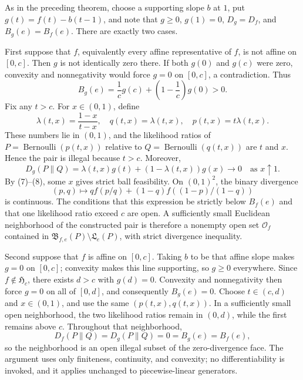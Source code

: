 As in the preceding theorem, choose a supporting slope \(b\) at \(1\), put \(g(t)=f(t)-b(t-1)\), and note that \(g\ge0\), \(g(1)=0\), \(D_g=D_f\), and \(B_g(e)=B_f(e)\).  There are exactly two cases.

First suppose that \(f\), equivalently every affine representative of \(f\), is not affine on \([0,c]\).  Then \(g\) is not identically zero there.  If both \(g(0)\) and \(g(c)\) were zero, convexity and nonnegativity would force \(g=0\) on \([0,c]\), a contradiction.  Thus
\[
 B_g(e)=\frac1c g(c)+\left(1-\frac1c\right)g(0)>0. \tag{7}
\]
Fix any \(t>c\).  For \(x\in(0,1)\), define
\[
 \lambda(t,x)=\frac{1-x}{t-x},\quad
 q(t,x)=\lambda(t,x),\quad
 p(t,x)=t\lambda(t,x).
\]
These numbers lie in \((0,1)\), and the likelihood ratios of \(P=\operatorname{Bernoulli}(p(t,x))\) relative to \(Q=\operatorname{Bernoulli}(q(t,x))\) are \(t\) and \(x\).  Hence the pair is illegal because \(t>c\).  Moreover,
\[
 D_g(P\|Q)=\lambda(t,x)g(t)+(1-\lambda(t,x))g(x)\longrightarrow0
 \quad\text{as }x\uparrow1. \tag{8}
\]
By (7)--(8), some \(x\) gives strict ball feasibility.  On \((0,1)^2\), the binary divergence
\[
 (p,q)\longmapsto qf(p/q)+(1-q)f((1-p)/(1-q))
\]
is continuous.  The conditions that this expression be strictly below \(B_f(e)\) and that one likelihood ratio exceed \(c\) are open.  A sufficiently small Euclidean neighborhood of the constructed pair is therefore a nonempty open set \(\mathcal O_f\) contained in \(\mathfrak B_{f,e}(P)\setminus\mathfrak L_e(P)\), with strict divergence inequality.

Second suppose that \(f\) is affine on \([0,c]\).  Taking \(b\) to be that affine slope makes \(g=0\) on \([0,c]\); convexity makes this line supporting, so \(g\ge0\) everywhere.  Since \(f\notin\mathfrak H_c\), there exists \(d>c\) with \(g(d)=0\).  Convexity and nonnegativity then force \(g=0\) on all of \([0,d]\), and consequently \(B_g(e)=0\).  Choose \(t\in(c,d)\) and \(x\in(0,1)\), and use the same \((p(t,x),q(t,x))\).  In a sufficiently small open neighborhood, the two likelihood ratios remain in \((0,d)\), while the first remains above \(c\).  Throughout that neighborhood,
\[
 D_f(P\|Q)=D_g(P\|Q)=0=B_g(e)=B_f(e),
\]
so the neighborhood is an open illegal subset of the zero-divergence face.  The argument uses only finiteness, continuity, and convexity; no differentiability is invoked, and it applies unchanged to piecewise-linear generators.